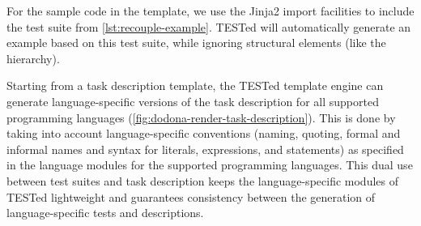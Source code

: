 \documentclass[../main]{subfiles}
\begin{document}
For the sample code in the template, we use the Jinja2 import facilities to include the test suite from \vref{lst:recouple-example}.
TESTed will automatically generate an example based on this test suite, while ignoring structural elements (like the hierarchy).

Starting from a task description template, the TESTed template engine can generate language-specific versions of the task description for all supported programming languages (\vref{fig:dodona-render-task-description}).
This is done by taking into account language-specific conventions (naming, quoting, formal and informal names and syntax for literals, expressions, and statements) as specified in the language modules for the supported programming languages.
This dual use between test suites and task description keeps the language-specific modules of TESTed lightweight and guarantees consistency between the generation of language-specific tests and descriptions.
\end{document}
